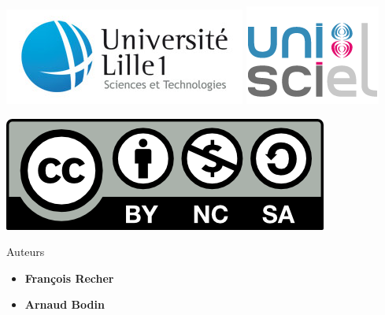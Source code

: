 







\begin{frame}

\thispagestyle{empty}    

  \hspace*{-20ex}
  \begin{minipage}{0.6\textwidth}
  \begin{center}
    \vspace*{5ex}   


    \bigskip

    \includegraphics[scale=0.3]{../divers/logotypeLille1-QUADRI-ECRAN.jpg}
    \quad
    \includegraphics[scale=0.3]{../divers/logo-unisciel.png}

    

    \vspace*{5ex}

    \includegraphics[scale=0.5]{../divers/by-nc-sa.png}
  \end{center}
  \end{minipage}
  \hfil
  \begin{minipage}{0.65\textwidth}
  \vspace*{5ex}
  Auteurs
  \begin{itemize}
    \item {\bf François Recher}
    \item {\bf Arnaud Bodin}
  \end{itemize}


\end{minipage}
\end{frame}
